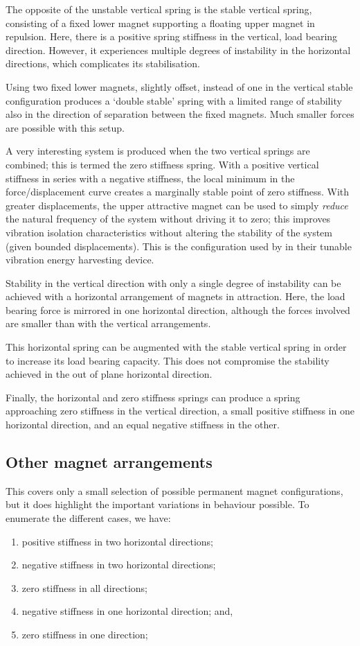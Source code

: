 \documentclass[11pt,a4paper]{memoir}
\begin{document}
The opposite of the unstable vertical spring is the stable vertical
spring, consisting of a fixed lower magnet supporting a floating upper
magnet in repulsion. Here, there is a positive spring stiffness in the
vertical, load bearing direction. However, it experiences multiple
degrees of instability in the horizontal directions, which complicates
its stabilisation.

Using two fixed lower magnets, slightly offset, instead of one in the
vertical stable configuration produces a `double stable' spring with a
limited range of stability also in the direction of separation between
the fixed magnets. Much smaller forces are possible with this setup.

A very interesting system is produced when the two vertical springs
are combined; this is termed the zero stiffness spring. With a
positive vertical stiffness in series with a negative stiffness, the
local minimum in the force/displacement curve creates a marginally
stable point of zero stiffness. With greater displacements, the upper
attractive magnet can be used to simply \emph{reduce} the natural
frequency of the system without driving it to zero; this improves
vibration isolation characteristics without altering the stability of
the system (given bounded displacements). This is the configuration
used by \textcite{challa2008} in their tunable vibration energy
harvesting device.

Stability in the vertical direction with only a single degree of
instability can be achieved with a horizontal arrangement of magnets
in attraction. Here, the load bearing force is mirrored in one
horizontal direction, although the forces involved are smaller than
with the vertical arrangements.

This horizontal spring can be augmented with the stable vertical
spring in order to increase its load bearing capacity. This does not
compromise the stability achieved in the out of plane horizontal
direction.

Finally, the horizontal and zero stiffness springs can produce a
spring approaching zero stiffness in the vertical direction, a small positive
stiffness in one horizontal direction, and an equal negative stiffness
in the other.

\subsection{Other magnet arrangements}

This covers only a small selection of possible permanent magnet
configurations, but it does highlight the important variations in
behaviour possible. To enumerate the different cases, we have:
\begin{enumerate}
\item positive stiffness in two horizontal directions;
\item negative stiffness in two horizontal directions;
\item zero stiffness in all directions;
\item negative stiffness in one horizontal direction; and,
\item zero stiffness in one direction;
\end{enumerate}
\end{document}
